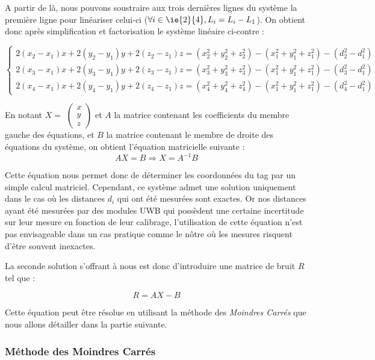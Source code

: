A partir de là, nous pouvons soustraire aux trois dernières lignes du système la première ligne pour linéariser celui-ci ($\forall i \in \ie{2}{4}, L_i=L_i-L_1$). On obtient donc après simplification et factorisation le système linéaire ci-contre :

\[
   \left\{
   \begin{aligned}
      2(x_2 - x_1)x + 2(y_2 - y_1)y + 2(z_2 - z_1)z = (x_2^2 + y_2^2 + z_2^2) - (x_1^2 + y_1^2 + z_1^2) - (d_2^2 - d_1^2) \\
      2(x_3 - x_1)x + 2(y_3 - y_1)y + 2(z_3 - z_1)z = (x_3^2 + y_3^2 + z_3^2) - (x_1^2 + y_1^2 + z_1^2) - (d_3^2 - d_1^2) \\
      2(x_4 - x_1)x + 2(y_4 - y_1)y + 2(z_4 - z_1)z = (x_4^2 + y_4^2 + z_4^2) - (x_1^2 + y_1^2 + z_1^2) - (d_4^2 - d_1^2) 
   \end{aligned}
   \right.
\]

En notant $X=$
$\begin{pmatrix}
    x \\
    y \\
    z
\end{pmatrix}$ et $A$ la matrice contenant les coefficients du membre gauche des équations, et $B$ la matrice contenant le membre de droite des équations du système, on obtient l'équation matricielle suivante :
\begin{equation}
    AX=B \Rightarrow X=A^{-1}B
\end{equation}

Cette équation nous permet donc de déterminer les coordonnées du tag par un simple calcul matriciel. Cependant, ce système admet une solution uniquement dans le cas où les distances $d_i$ qui ont été mesurées sont exactes. Or nos distances ayant été mesurées par des modules UWB qui possèdent une certaine incertitude sur leur mesure en fonction de leur calibrage, l'utilisation de cette équation n'est pas envisageable dans un cas pratique comme le nôtre où les mesures risquent d'être souvent inexactes.

La seconde solution s'offrant à nous est donc d'introduire une matrice de bruit $R$ tel que :

\begin{equation}
    R=AX-B
\end{equation}

Cette équation peut être résolue en utilisant la méthode des \emph{Moindres Carrés} que nous allons détailler dans la partie suivante.

\subsubsection{Méthode des Moindres Carrés}

